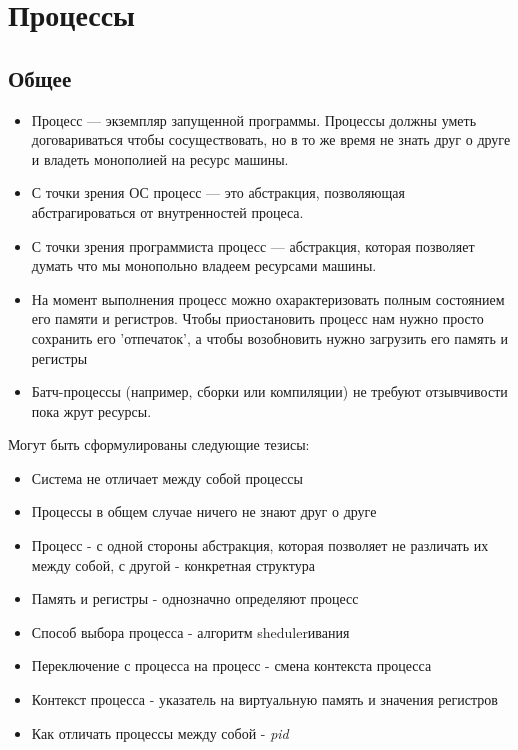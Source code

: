 \documentclass[../lectures.tex]{subfiles}
\begin{document}
\chapter{Процессы}
\section{Общее}
\begin{itemize}
    \item Процесс --- экземпляр запущенной программы. Процессы должны уметь договариваться
    чтобы сосуществовать, но в то же время не знать друг о друге и владеть
    монополией на ресурс машины. 

    \item С точки зрения ОС процесс --- это абстракция, позволяющая абстрагироваться от внутренностей процеса. 

    \item С точки зрения программиста процесс --- абстракция, 
    которая позволяет думать что мы монопольно владеем ресурсами машины.

    \item На момент выполнения процесс можно охарактеризовать полным состоянием его памяти
    и регистров. Чтобы приостановить процесс нам нужно просто сохранить его 'отпечаток', 
    а чтобы возобновить нужно загрузить его память и регистры

    \item Батч-процессы (например, сборки или компиляции) не требуют отзывчивости пока жрут ресурсы.
\end{itemize}

Могут быть сформулированы следующие тезисы:
\begin{itemize}
    \item Система не отличает между собой процессы
    \item Процессы в общем случае ничего не знают друг о друге
    \item Процесс - с одной стороны абстракция, которая позволяет не различать их 
          между собой, с другой - конкретная структура
    \item Память и регистры - однозначно определяют процесс
    \item Способ выбора процесса - алгоритм shedulerивания
    \item Переключение с процесса на процесс - смена контекста процесса
    \item Контекст процесса - указатель на виртуальную память и значения регистров
    \item Как отличать процессы между собой - \emph{pid}
\end{itemize}
\end{document}
